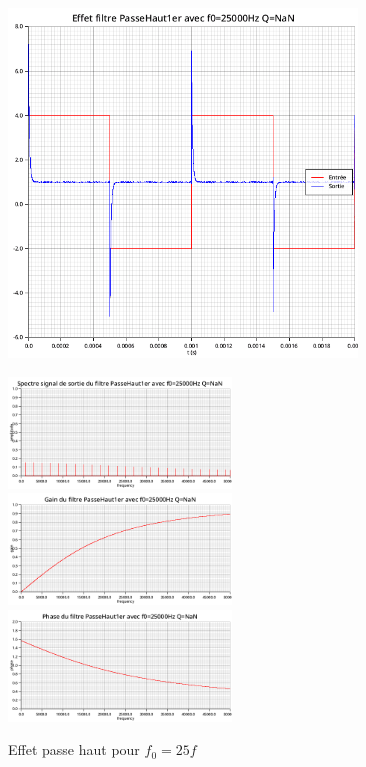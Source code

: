 \documentclass{article}
\begin{document}
\begin{figure}[H]
  \begin{minipage}{0.6\textwidth}
      \centering
      \includegraphics[width=25em]{images/creneau/haut/25/signals.png}
  \end{minipage}
  \begin{minipage}{0.3\textwidth}
      \centering
      \includegraphics[width=16em]{images/creneau/haut/25/fft_out.png}
      \vfill
      \includegraphics[width=16em]{images/creneau/haut/25/gain.png}
      \vfill
      \includegraphics[width=16em]{images/creneau/haut/25/phase.png}
  \end{minipage}
  \caption{Effet passe haut pour $f_0=25f$}
\end{figure}
\end{document}
